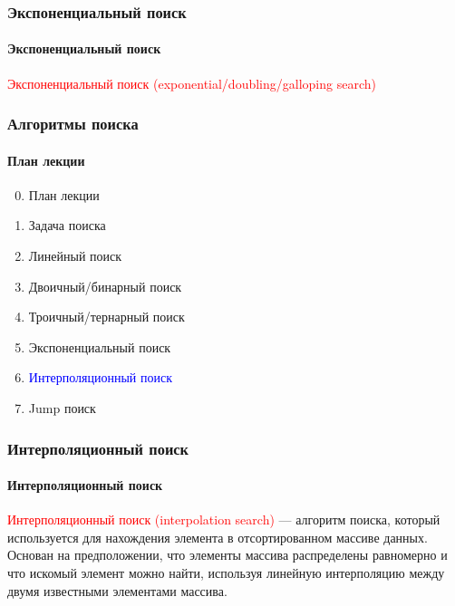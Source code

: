 \documentclass[aspectratio=169]{beamer}
\begin{document}
\begin{frame}
\frametitle{Экспоненциальный поиск}
\framesubtitle{Экспоненциальный поиск}
\justifying

\textcolor{red}{Экспоненциальный поиск (exponential/doubling/galloping search)}
\begin{figure}
    \captionsetup[subfigure]{labelformat=empty}
    \centering
\end{figure}

\end{frame}

\begin{frame}
\frametitle{Алгоритмы поиска}
\framesubtitle{План лекции}

\begin{enumerate}
  \setcounter{enumi}{-1}
  \item{План лекции}
  \item{Задача поиска}
  \item{Линейный поиск}
  \item{Двоичный/бинарный поиск}
  \item{Троичный/тернарный поиск}
  \item{Экспоненциальный поиск}
  \item{\textcolor{blue}{Интерполяционный поиск}}
  \item{Jump поиск}
\end{enumerate}
\end{frame}

\begin{frame}
\frametitle{Интерполяционный поиск}
\framesubtitle{Интерполяционный поиск}
\justifying
\textcolor{red}{Интерполяционный поиск (interpolation search)} — алгоритм поиска, который \newline используется для нахождения элемента в отсортированном массиве данных. \newline\newline Основан на предположении, что элементы массива распределены равномерно и что искомый элемент можно найти, используя линейную интерполяцию между двумя известными элементами массива.

\begin{figure}
    \captionsetup[subfigure]{labelformat=empty}
    \centering
\end{figure}

\end{frame}
\end{document}
